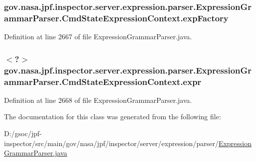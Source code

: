 \subsubsection[{\texorpdfstring{exp\+Factory}{expFactory}}]{ gov.\+nasa.\+jpf.\+inspector.\+server.\+expression.\+parser.\+Expression\+Grammar\+Parser.\+Cmd\+State\+Expression\+Context.\+exp\+Factory}\hypertarget{classgov_1_1nasa_1_1jpf_1_1inspector_1_1server_1_1expression_1_1parser_1_1_expression_grammar_pa37db371aaa956234112b7f14e4ab3f14_a916a26685569bdfd4dbdc9a6909e9b02}{}\label{classgov_1_1nasa_1_1jpf_1_1inspector_1_1server_1_1expression_1_1parser_1_1_expression_grammar_pa37db371aaa956234112b7f14e4ab3f14_a916a26685569bdfd4dbdc9a6909e9b02}


Definition at line 2667 of file Expression\+Grammar\+Parser.\+java.

\subsubsection[{\texorpdfstring{expr}{expr}}]{$<$?$>$ gov.\+nasa.\+jpf.\+inspector.\+server.\+expression.\+parser.\+Expression\+Grammar\+Parser.\+Cmd\+State\+Expression\+Context.\+expr}\hypertarget{classgov_1_1nasa_1_1jpf_1_1inspector_1_1server_1_1expression_1_1parser_1_1_expression_grammar_pa37db371aaa956234112b7f14e4ab3f14_a89be3036854926f4b98c61708a180f1a}{}\label{classgov_1_1nasa_1_1jpf_1_1inspector_1_1server_1_1expression_1_1parser_1_1_expression_grammar_pa37db371aaa956234112b7f14e4ab3f14_a89be3036854926f4b98c61708a180f1a}


Definition at line 2668 of file Expression\+Grammar\+Parser.\+java.



The documentation for this class was generated from the following file\+:\begin{DoxyCompactItemize}
\item 
D\+:/gsoc/jpf-\/inspector/src/main/gov/nasa/jpf/inspector/server/expression/parser/\hyperlink{_expression_grammar_parser_8java}{Expression\+Grammar\+Parser.\+java}\end{DoxyCompactItemize}
